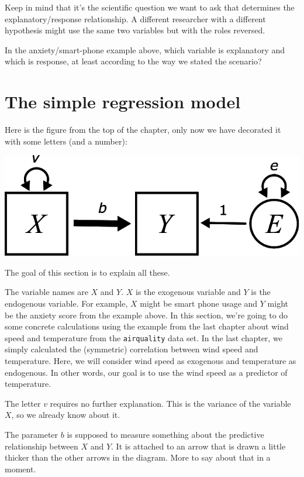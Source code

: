 \documentclass[
]{book}
\begin{document}
Keep in mind that it's the scientific question we want to ask that determines the explanatory/response relationship. A different researcher with a different hypothesis might use the same two variables but with the roles reversed.

In the anxiety/smart-phone example above, which variable is explanatory and which is response, at least according to the way we stated the scenario?

\hypertarget{simple-model}{%
\section{The simple regression model}\label{simple-model}}

Here is the figure from the top of the chapter, only now we have decorated it with some letters (and a number):

\begin{center}\includegraphics{graphics/simple_regression_params} \end{center}

The goal of this section is to explain all these.

The variable names are \(X\) and \(Y\). \(X\) is the exogenous variable and \(Y\) is the endogenous variable. For example, \(X\) might be smart phone usage and \(Y\) might be the anxiety score from the example above. In this section, we're going to do some concrete calculations using the example from the last chapter about wind speed and temperature from the \texttt{airquality} data set. In the last chapter, we simply calculated the (symmetric) correlation between wind speed and temperature. Here, we will consider wind speed as exogenous and temperature as endogenous. In other words, our goal is to use the wind speed as a predictor of temperature.

The letter \(v\) requires no further explanation. This is the variance of the variable \(X\), so we already know about it.

The parameter \(b\) is supposed to measure something about the predictive relationship between \(X\) and \(Y\). It is attached to an arrow that is drawn a little thicker than the other arrows in the diagram. More to say about that in a moment.
\end{document}
